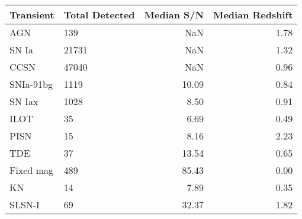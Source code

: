 \begin{tabular}{llrr}
\toprule
Transient & Total Detected & Median S/N & Median Redshift \\
\midrule
AGN & 139 & NaN & 1.78 \\
SN Ia & 21731 & NaN & 1.32 \\
CCSN & 47040 & NaN & 0.96 \\
SNIa-91bg & 1119 & 10.09 & 0.84 \\
SN Iax & 1028 & 8.50 & 0.91 \\
ILOT & 35 & 6.69 & 0.49 \\
PISN & 15 & 8.16 & 2.23 \\
TDE & 37 & 13.54 & 0.65 \\
Fixed mag & 489 & 85.43 & 0.00 \\
KN & 14 & 7.89 & 0.35 \\
SLSN-I & 69 & 32.37 & 1.82 \\
\bottomrule
\end{tabular}
